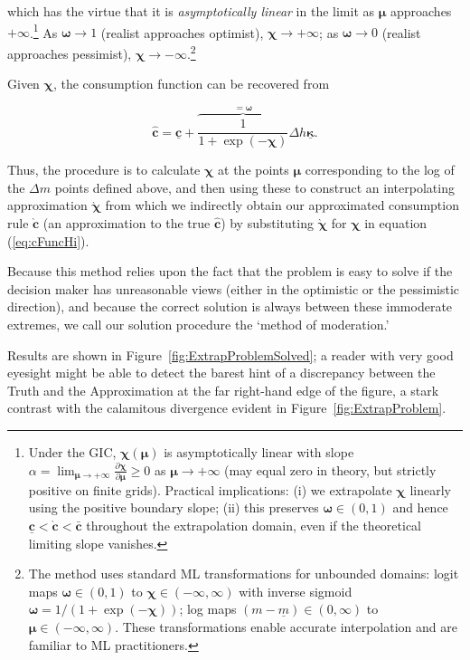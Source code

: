 \documentclass[twocolumn, switch]{article}
\newcommand{\mNrm}{m}
\newcommand{\cFunc}{\mathbf{c}}
\newcommand{\cFuncOpt}{\bar{\cFunc}}
\newcommand{\cFuncApprox}{\grave{\cFunc}}
\newcommand{\hNrm}{h}
\newcommand{\MPC}{\boldsymbol{\kappa}}
\newcommand{\MPCmin}{\underline{\MPC}}
\newcommand{\mNrmMin}{\underline{\mNrm}}
\newcommand{\logmNrmEx}{\boldsymbol{\mu}}
\newcommand{\modRte}{\boldsymbol{\omega}}
\newcommand{\mNrmEx}{\Delta \mNrm}
\newcommand{\hNrmEx}{\Delta \hNrm}
\newcommand{\cFuncPes}{\underline{\cFunc}}
\newcommand{\cFuncReal}{\hat{\cFunc}}
\newcommand{\logitModRte}{\boldsymbol{\chi}}
\newcommand{\asympSlope}{\alpha}
\newcommand{\logitModRteApprox}{\grave{\logitModRte}}
\begin{document}
which has the virtue that it is \textit{asymptotically linear} in the limit as
$\logmNrmEx$ approaches $+\infty$.\footnote{Under the GIC, $\logitModRte(\logmNrmEx)$ is asymptotically linear with slope $\asympSlope = \lim_{\logmNrmEx \to +\infty} \frac{\partial \logitModRte}{\partial \logmNrmEx} \geq 0$ as $\logmNrmEx \to +\infty$ (may equal zero in theory, but strictly positive on finite grids). Practical implications: (i) we extrapolate $\logitModRte$ linearly using the positive boundary slope; (ii) this preserves $\modRte\in(0,1)$ and hence $\cFuncPes < \cFuncApprox < \cFuncOpt$ throughout the extrapolation domain, even if the theoretical limiting slope vanishes.} As
$\modRte \to 1$ (realist approaches optimist), $\logitModRte \to +\infty$;
as $\modRte \to 0$ (realist approaches pessimist), $\logitModRte \to -\infty$.\footnote{The method uses standard ML transformations for unbounded domains: logit maps $\modRte \in (0,1)$ to $\logitModRte \in ( -\infty, \infty)$ with inverse sigmoid $\modRte = 1/(1+\exp( -\logitModRte))$; log maps $(\mNrm - \mNrmMin) \in (0, \infty)$ to $\logmNrmEx \in ( -\infty, \infty)$. These transformations enable accurate interpolation and are familiar to ML practitioners.}

Given $\logitModRte$, the consumption function can be recovered from

\begin{equation}
\label{eq:cFuncHi}
\cFuncReal = \cFuncPes+\overbrace{\frac{1}{1+\exp(-\logitModRte)}}^{=\modRte} \hNrmEx \MPCmin.
\end{equation}

Thus, the procedure is to calculate $\logitModRte$ at the points
$\logmNrmEx$ corresponding to the log of the $\mNrmEx$ points
defined above, and then using these to construct an interpolating approximation
$\logitModRteApprox$ from which we indirectly obtain our approximated
consumption rule $\cFuncApprox$ (an approximation to the true $\cFuncReal$) by substituting $\logitModRteApprox$ for
$\logitModRte$ in equation (\ref{eq:cFuncHi}).

Because this method relies upon the fact that the problem is easy to solve if
the decision maker has unreasonable views (either in the optimistic or the
pessimistic direction), and because the correct solution is always between these
immoderate extremes, we call our solution procedure the `method of moderation.'

Results are shown in Figure~\ref{fig:ExtrapProblemSolved}; a reader with very good
eyesight might be able to detect the barest hint of a discrepancy between the
Truth and the Approximation at the far right-hand edge of the figure, a stark
contrast with the calamitous divergence evident in Figure~\ref{fig:ExtrapProblem}.
\end{document}

